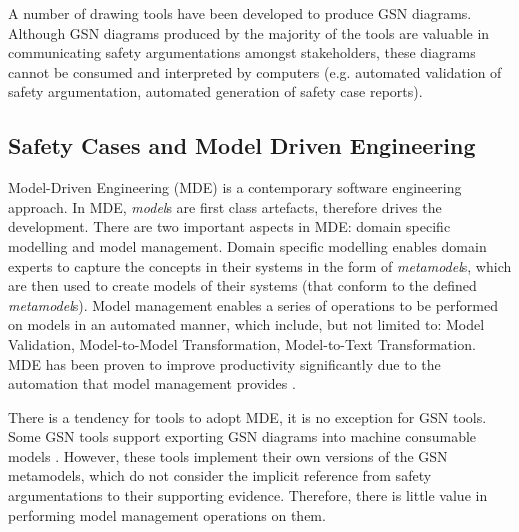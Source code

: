 A number of drawing tools have been developed \cite{asce, iscade, yorkgsn, certWare, astahGSN} to produce GSN diagrams. Although GSN diagrams produced by the majority of the tools are valuable in communicating safety argumentations amongst stakeholders, these diagrams cannot be consumed and interpreted by computers (e.g. automated validation of safety argumentation, automated generation of safety case reports). 


\subsection{Safety Cases and Model Driven Engineering}
Model-Driven Engineering (MDE) is a contemporary software engineering approach. In MDE, \textit{model}s are first class artefacts, therefore drives the development. There are two important aspects in MDE: domain specific modelling and model management. Domain specific modelling enables domain experts to capture the concepts in their systems in the form of \textit{metamodel}s, which are then used to create models of their systems (that conform to the defined \textit{metamodel}s). Model management enables a series of operations to be performed on models in an automated manner, which include, but not limited to: Model Validation, Model-to-Model Transformation, Model-to-Text Transformation. MDE has been proven to improve productivity significantly due to the automation that model management provides \cite{jaaksi2002developing, karna2009evaluating}. 

There is a tendency for tools to adopt MDE, it is no exception for GSN tools. Some GSN tools support exporting GSN diagrams into machine consumable models \cite{certWare, astahGSN}. However, these tools implement their own versions of the GSN metamodels, which do not consider the implicit reference from safety argumentations to their supporting evidence. Therefore, there is little value in performing model management operations on them.


%

